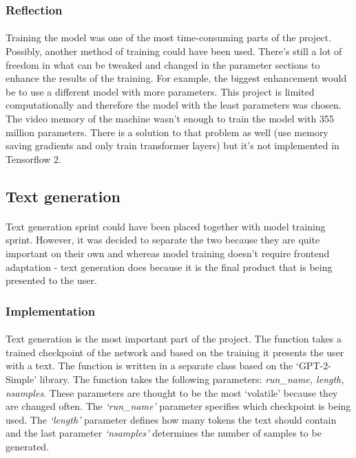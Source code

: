 \documentclass[12pt]{report}
\begin{document}
\subsubsection*{Reflection}
\paragraph{}
Training the model was one of the most time-consuming parts of the project. Possibly, another method of training could
have been used. There's still a lot of freedom in what can be tweaked and changed in the parameter sections to
enhance the results of the training. For example, the biggest enhancement would be to use a different model with more
parameters. This project is limited computationally and therefore the model with the least parameters was chosen. The video
memory of the machine wasn't enough to train the model with 355 million parameters. There is a solution to that problem
as well (use memory saving gradients and only train transformer layers) but it's not implemented in Tensorflow 2.

\clearpage 

\subsection*{Text generation}
\paragraph{}
Text generation sprint could have been placed together with model training sprint. However, it was decided to separate
the two because they are quite important on their own and whereas model training doesn't require frontend adaptation -
text generation does because it is the final product that is being presented to the user.
\subsubsection*{Implementation}
\paragraph{}
Text generation is the most important part of the project. The function takes a trained checkpoint of the network and
based on the training it presents the user with a text. The function is written in a separate class based on the
`GPT-2-Simple' library. The function takes the following parameters: \textit{run\_name, length, nsamples}. These
parameters are thought to be the most `volatile' because they are changed often. The \textit{`run\_name'} parameter specifies
which checkpoint is being used. The \textit{`length'} parameter defines how many tokens the text should contain and the last parameter
\textit{`nsamples'} determines the number of samples to be generated.
\end{document}
